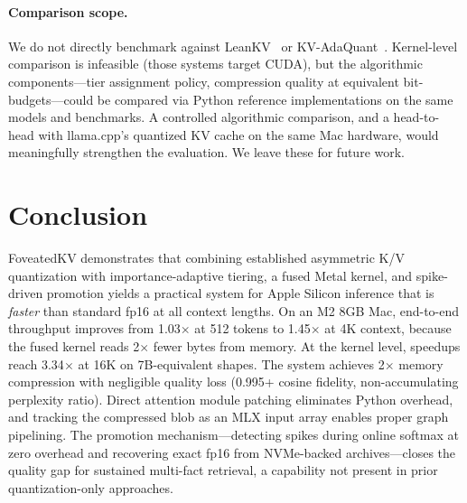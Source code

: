 \documentclass{article}
\begin{document}
\paragraph{Comparison scope.} We do not directly benchmark against
LeanKV~\cite{leankv} or KV-AdaQuant~\cite{kvadaquant}. Kernel-level
comparison is infeasible (those systems target CUDA), but the
algorithmic components---tier assignment policy, compression quality at
equivalent bit-budgets---could be compared via Python reference
implementations on the same models and benchmarks. A controlled
algorithmic comparison, and a head-to-head with llama.cpp's quantized
KV cache on the same Mac hardware, would meaningfully strengthen the
evaluation. We leave these for future work.

\section{Conclusion}

FoveatedKV demonstrates that combining established asymmetric K/V
quantization with importance-adaptive tiering, a fused Metal kernel, and
spike-driven promotion yields a practical system for Apple Silicon
inference that is \emph{faster} than standard fp16 at all context
lengths. On an M2 8GB Mac, end-to-end throughput improves from
1.03$\times$ at 512 tokens to 1.45$\times$ at 4K context, because the
fused kernel reads 2$\times$ fewer bytes from memory. At the kernel
level, speedups reach 3.34$\times$ at 16K on 7B-equivalent shapes. The
system achieves 2$\times$ memory compression with negligible quality loss
(0.995+ cosine fidelity, non-accumulating perplexity ratio). Direct
attention module patching eliminates Python overhead, and tracking the
compressed blob as an MLX input array enables proper graph pipelining.
The promotion mechanism---detecting spikes during online softmax at zero
overhead and recovering exact fp16 from NVMe-backed archives---closes the
quality gap for sustained multi-fact retrieval, a capability not present
in prior quantization-only approaches.
\end{document}
